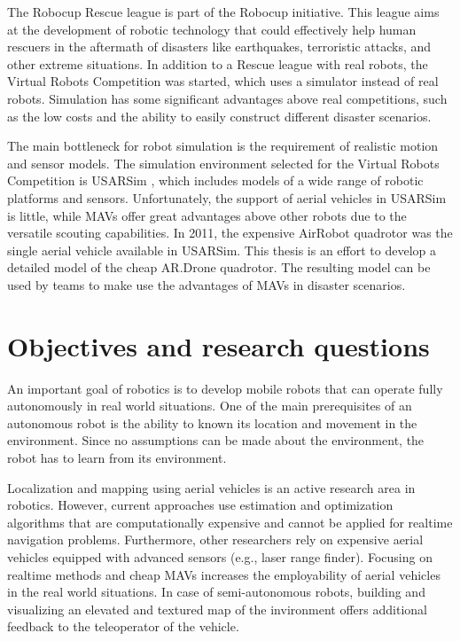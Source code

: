 The Robocup Rescue league is part of the Robocup initiative.
This league aims at the development of robotic technology that could effectively help human rescuers in the aftermath of disasters like earthquakes, terroristic attacks, and other extreme situations.
In addition to a Rescue league with real robots, the Virtual Robots Competition was started, which uses a simulator instead of real robots.
Simulation has some significant advantages above real competitions, such as the low costs and the ability to easily construct different disaster scenarios.

The main bottleneck for robot simulation is the requirement of realistic motion and sensor models.
The simulation environment selected for the Virtual Robots Competition is USARSim \cite{Balakirsky2009iros,carpin2007usarsim}, which includes models of a wide range of robotic platforms and sensors.
Unfortunately, the support of aerial vehicles in USARSim is little, while MAVs offer great advantages above other robots due to the versatile scouting capabilities.
In 2011, the expensive AirRobot quadrotor was the single aerial vehicle available in USARSim.
This thesis is an effort to develop a detailed model of the cheap AR.Drone quadrotor.
The resulting model can be used by teams to make use the advantages of MAVs in disaster scenarios.


	\section{Objectives and research questions}
An important goal of robotics is to develop mobile robots that can operate fully autonomously in real world situations.
One of the main prerequisites of an autonomous robot is the ability to known its location and movement in the environment.
Since no assumptions can be made about the environment, the robot has to learn from its environment.

Localization and mapping using aerial vehicles is an active research area in robotics.
However, current approaches use estimation and optimization algorithms that are computationally expensive and cannot be applied for realtime navigation problems.
Furthermore, other researchers rely on expensive aerial vehicles equipped with advanced sensors (e.g., laser range finder).
Focusing on realtime methods and cheap MAVs increases the employability of aerial vehicles in the real world situations.
In case of semi-autonomous robots, building and visualizing an elevated and textured map of the invironment offers additional feedback to the teleoperator of the vehicle.

